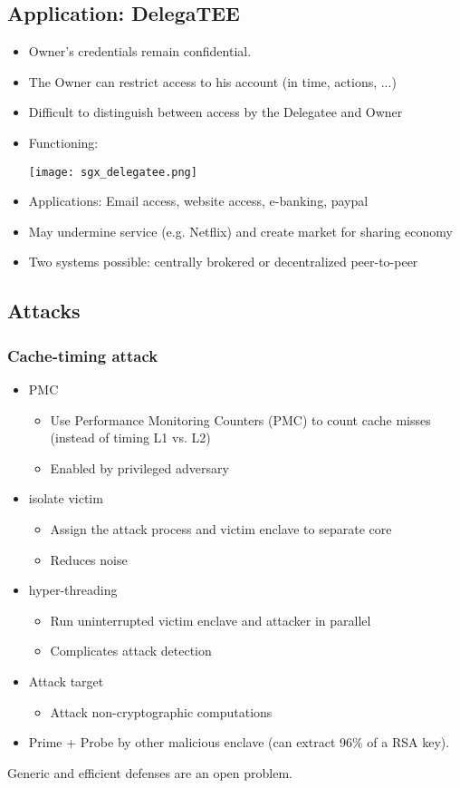 \subsection{Application: DelegaTEE}
\begin{itemize}
  \item Owner's credentials remain confidential.
  \item The Owner can restrict access to his account (in time, actions,
    ...)
  \item Difficult to distinguish between access by the
    Delegatee and Owner
  \item Functioning:
    \begin{center}
      \texttt{[image: sgx\_delegatee.png]}
    \end{center}
  \item Applications: Email access, website access, e-banking, paypal
  \item May undermine service (e.g. Netflix) and create market for sharing
    economy
  \item Two systems possible: centrally brokered or decentralized
    peer-to-peer
\end{itemize}

\subsection{Attacks}
\subsubsection{Cache-timing attack}
\begin{itemize}
  \item  PMC
    \begin{itemize}
      \item Use Performance Monitoring Counters (PMC) to count cache misses
	(instead of timing L1 vs. L2)
      \item Enabled by privileged adversary
    \end{itemize}
  \item  isolate victim
    \begin{itemize}
      \item Assign the attack process and victim enclave to separate core
      \item Reduces noise
    \end{itemize}
  \item  hyper-threading
    \begin{itemize}
      \item Run uninterrupted victim enclave and attacker in parallel
      \item Complicates attack detection
    \end{itemize}
  \item Attack target
    \begin{itemize}
      \item Attack non-cryptographic computations
    \end{itemize}
  \item Prime + Probe by other malicious enclave (can extract 96\% of a RSA key).
\end{itemize}
Generic and efficient defenses  are an open problem.

